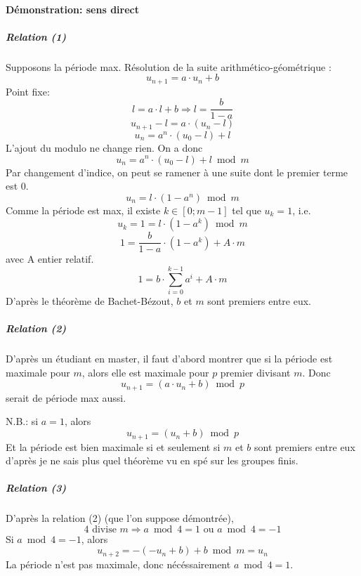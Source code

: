\documentclass[10pt,a4paper]{article}
\begin{document}
\paragraph{Démonstration: sens direct}
\subparagraph{Relation (1)}


Supposons la période max. Résolution de la suite arithmético-géométrique :
\[
u_{n+1} = a \cdot u_n + b
\]
Point fixe:
\[
l = a \cdot l + b \Rightarrow l = \frac{b}{1-a}
\]
\[
u_{n+1} - l = a \cdot (u_n - l)
\]
\[
u_n = a^n \cdot (u_0 - l) + l
\]
L'ajout du modulo ne change rien. On a donc
\[
\boxed{ u_n = a^n \cdot (u_0 - l) + l \bmod m }
\]
Par changement d'indice, on peut se ramener à une suite dont le premier terme est 0.
\[
u_n =  l \cdot (1 - a^n) \bmod m
\]
Comme la période est max, il existe $k \in [0;m-1]$ tel que $u_k = 1$, i.e.
\[
u_k = 1 = l \cdot (1 - a^k) \bmod m
\]
\[
1 = \frac{b}{1-a} \cdot (1 - a^k) + A\cdot m
\]
avec A entier relatif.
\[
\boxed{ 1 = b \cdot \sum_{i=0}^{k-1} a^i + A\cdot m }
\]
D'après le théorème de Bachet-Bézout, $b$ et $m$ sont premiers entre eux.


\subparagraph{Relation (2)}
D'après un étudiant en master, il faut d'abord montrer que si la période est maximale pour $m$, alors elle est maximale pour $p$ premier divisant $m$. Donc
\[
u_{n+1} = (a \cdot u_n + b) \bmod p
\]
serait de période max aussi.

N.B.: si $a=1$, alors
\[
u_{n+1} = (u_n + b) \bmod p
\]
Et la période est bien maximale si et seulement si $m$ et $b$ sont premiers entre eux d'après je ne sais plus quel théorème vu en spé sur les groupes finis.

\subparagraph{Relation (3)}
D'après la relation (2) (que l'on suppose démontrée),
\[
4 \text{ divise } m \Rightarrow a \bmod 4 = 1 \text{ ou } a \bmod 4 = -1
\]
Si $a \bmod 4 = -1$, alors
\[
u_{n+2} = -(-u_n + b) + b \bmod m = u_n
\]
La période n'est pas maximale, donc nécéssairement $a \bmod 4 = 1$.


\end{document}
